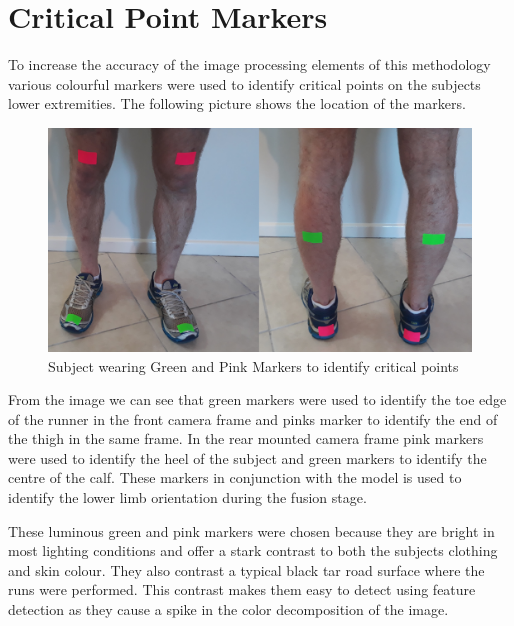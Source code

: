 \section{Critical Point Markers}
To increase the accuracy of the image processing elements of this methodology various colourful markers were used to identify critical points on the subjects lower extremities. The following picture shows the location of the markers.

\begin{figure}[!ht] 
\captionsetup{width=\linewidth, font=small}  
\includegraphics[width=\linewidth]{figures/markers.JPG}
\caption{Subject wearing Green and Pink Markers to identify critical points}
\label{fig:markers}
\end{figure}

From the image we can see that green markers were used to identify  the toe edge of the runner in the front camera frame and pinks marker to identify the end of the thigh in the same frame. In the rear mounted camera frame pink markers were used to identify the heel of the subject and green markers to identify the centre of the calf. These markers in conjunction with the model is used to identify the lower limb orientation during the fusion stage.

These luminous green and pink markers were chosen because they are bright in most lighting conditions and offer a stark contrast to both the subjects clothing and skin colour. They also contrast a typical black tar road surface where the runs were performed. This contrast makes them easy to detect using feature detection as they  cause a spike in the color decomposition of the image.




